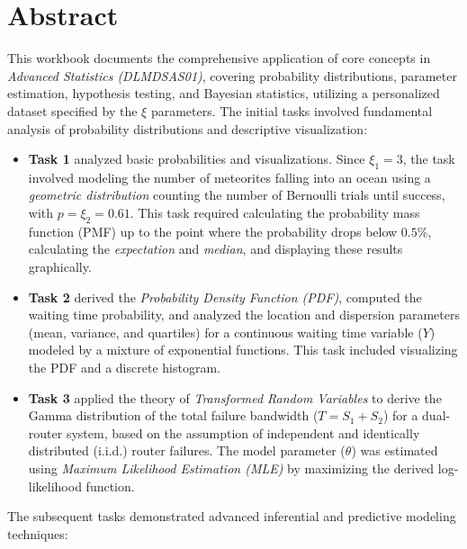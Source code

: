 \chapter*{Abstract}
\vspace*{-25pt}
This workbook documents the comprehensive application of core concepts in \emph{Advanced Statistics (DLMDSAS01)}, covering probability distributions, parameter estimation, hypothesis testing, and Bayesian statistics, utilizing a personalized dataset specified by the $\xi$ parameters.
\newline
The initial tasks involved fundamental analysis of probability distributions and descriptive visualization:
\begin{itemize}
    \item \textbf{Task 1} analyzed basic probabilities and visualizations. Since $\xi_1 = 3$, the task involved modeling the number of meteorites falling into an ocean using a \emph{geometric distribution} counting the number of Bernoulli trials until success, with $p = \xi_2 = 0.61$. This task required calculating the probability mass function (PMF) up to the point where the probability drops below $0.5\%$, calculating the \emph{expectation} and \emph{median}, and displaying these results graphically.
    \item \textbf{Task 2} derived the \emph{Probability Density Function (PDF)}, computed the waiting time probability, and analyzed the location and dispersion parameters (mean, variance, and quartiles) for a continuous waiting time variable ($Y$) modeled by a mixture of exponential functions. This task included visualizing the PDF and a discrete histogram.
    \item \textbf{Task 3} applied the theory of \emph{Transformed Random Variables} to derive the Gamma distribution of the total failure bandwidth ($T = S_1 + S_2$) for a dual-router system, based on the assumption of independent and identically distributed (i.i.d.) router failures. The model parameter ($\theta$) was estimated using \emph{Maximum Likelihood Estimation (MLE)} by maximizing the derived log-likelihood function.
\end{itemize}
The subsequent tasks demonstrated advanced inferential and predictive modeling techniques:
